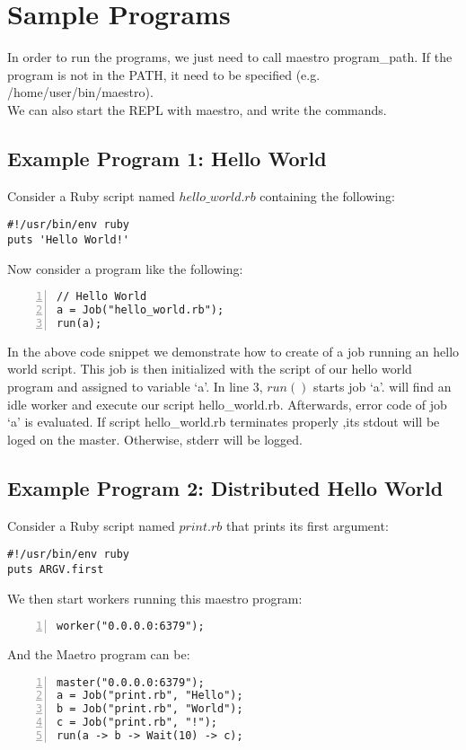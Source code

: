 \section{Sample Programs}
\label{sect:samples}
In order to run the programs, we just need to call maestro program\_path. If the \lang{} 
program is not in the PATH, it need to be specified (e.g. /home/user/bin/maestro).\\
We can also start the REPL with maestro, and write the commands.

\subsection*{Example Program 1: Hello World}
Consider a Ruby script named $hello\_world.rb$ containing the following:
\begin{verbatim}
#!/usr/bin/env ruby
puts 'Hello World!'
\end{verbatim}
Now consider a \lang{} program like the following:
\begin{Verbatim}[numbers=left]
// Hello World
a = Job("hello_world.rb");
run(a);
\end{Verbatim}

In the above code snippet we demonstrate how to create of a job running an hello world script.
This job is then initialized with the script of our hello world program and
assigned to variable `a'. In line 3, $run()$ starts job `a'. 
\lang{} will find an idle worker and execute our script hello\_world.rb.
Afterwards, error code of job `a' is evaluated. If script hello\_world.rb terminates properly
,its stdout will be loged on the master. Otherwise, stderr will be logged.

\subsection*{Example Program 2: Distributed Hello World}
Consider a Ruby script named $print.rb$ that prints its first argument:
\begin{verbatim}
#!/usr/bin/env ruby
puts ARGV.first
\end{verbatim}
We then start workers running this maestro program:
\begin{Verbatim}[numbers=left]
worker("0.0.0.0:6379");
\end{Verbatim}
And the Maetro program can be:
\begin{Verbatim}[numbers=left]
master("0.0.0.0:6379");
a = Job("print.rb", "Hello");
b = Job("print.rb", "World");
c = Job("print.rb", "!");
run(a -> b -> Wait(10) -> c);
\end{Verbatim}

